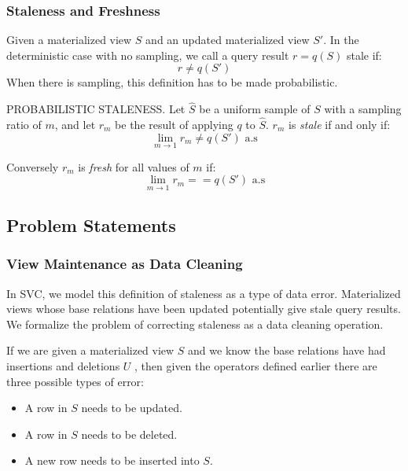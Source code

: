 \subsubsection{Staleness and Freshness}

Given a materialized view $S$ and an updated materialized view $S'$.
In the deterministic case with no sampling, we call a query result $r = q(S)$ stale if:
\[r \ne q(S')\]
When there is sampling, this definition has to be made probabilistic.



\begin{definition} PROBABILISTIC STALENESS.
Let $\hat{S}$ be a uniform sample of $S$ with a sampling ratio of $m$,
and let $r_m$ be the result of applying $q$ to $\hat{S}$.
$r_m$ is \emph{stale} if and only if:
\[\lim_{m\rightarrow 1} r_m \ne q(S') \text{  a.s}\]

Conversely $r_m$ is \emph{fresh} for all values of $m$ if:
\[\lim_{m\rightarrow 1} r_m == q(S') \text{  a.s}\]
\end{definition}

\subsection{Problem Statements}
\subsubsection{View Maintenance as Data Cleaning}
In SVC, we model this definition of staleness as a type of data error.
Materialized views whose base relations have been updated potentially give stale query results.
We formalize the problem of correcting staleness as a data cleaning operation.

If we are given a materialized view $S$ and we know the base relations have had insertions and deletions $U$ , then given the operators defined earlier there are three possible types of error:
\begin{itemize}
\item A row in $S$ needs to be updated.
\item A row in $S$ needs to be deleted.
\item A new row needs to be inserted into $S$.
\end{itemize}

